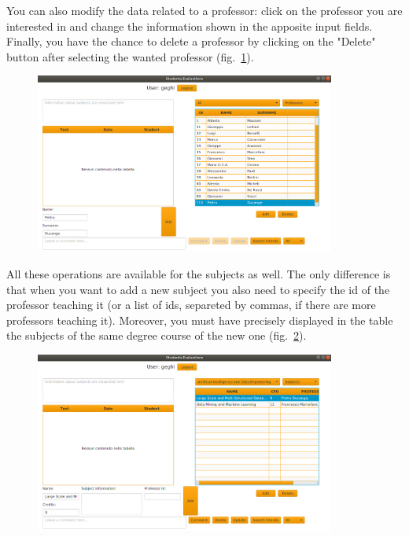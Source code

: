 \documentclass[a4paper]{article}
\begin{document}
You can also modify the data related to a professor: click on the professor you are interested in and change the information shown in the apposite input fields. Finally, you have the chance to delete a professor by clicking on the "Delete" button after selecting the wanted professor (fig.~\ref{fig:admin2}).
\begin{figure}[h]
\centering
\includegraphics[width=0.88\textwidth]{images/screens/admin2}
\label{fig:admin2}
\end{figure}

All these operations are available for the subjects as well. The only difference is that when you want to add a new subject you also need to specify the id of the professor teaching it (or a list of ids, separeted by commas, if there are more professors teaching it). Moreover, you must have precisely displayed in the table the subjects of the same degree course of the new one (fig.~\ref{fig:admin3}).
\clearpage
\begin{figure}[h]
\centering
\includegraphics[width=0.88\textwidth]{images/screens/admin3}
\label{fig:admin3}
\end{figure}
\end{document}
